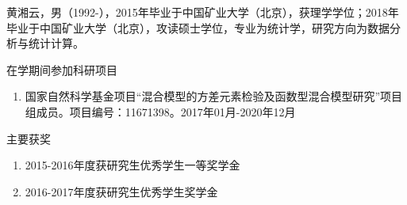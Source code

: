 \documentclass[hyperref, a4paper, UTF8, zihao = -4, linespread = 1.25, scheme = chinese]{ctexbook}
\providecommand{\tightlist}{%
  \setlength{\itemsep}{0pt}\setlength{\parskip}{0pt}}
\renewcommand\appendix{\setcounter{secnumdepth}{-1}}
\begin{document}
黄湘云，男（1992-），2015年毕业于中国矿业大学（北京），获理学学位；2018年毕业于中国矿业大学（北京），攻读硕士学位，专业为统计学，研究方向为数据分析与统计计算。


\begin{center}
{\kaishu {} 在学期间参加科研项目}
\end{center}

\begin{enumerate}
\tightlist
\item 国家自然科学基金项目“混合模型的方差元素检验及函数型混合模型研究”项目组成员。项目编号：11671398。2017年01月-2020年12月
\end{enumerate}

\begin{center}
{\kaishu {} 主要获奖}
\end{center}

\begin{enumerate}
\tightlist
\item 2015-2016年度获研究生优秀学生一等奖学金
\item 2016-2017年度获研究生优秀学生奖学金
\end{enumerate}


% 
% 




\backmatter
\end{document}
